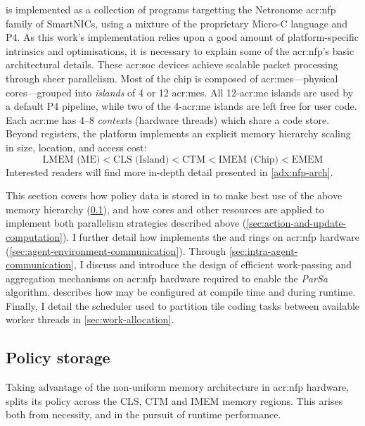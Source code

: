 \approachshort{} is implemented as a collection of programs targetting the Netronome \gls{acr:nfp} family of SmartNICs, using a mixture of the proprietary Micro-C language and P4.
As this work's implementation relies upon a good amount of platform-specific intrinsics and optimisations, it is necessary to explain some of the \gls{acr:nfp}'s basic architectural details.
These \gls{acr:soc} devices achieve scalable packet processing through sheer parallelism.
Most of the chip is composed of \glspl{acr:me}---physical cores---grouped into \emph{islands} of 4 or 12 \glspl{acr:me}.
All 12-\gls{acr:me} islands are used by a default P4 pipeline, while two of the 4-\gls{acr:me} islands are left free for user code.
Each \gls{acr:me} has \numrange{4}{8} \emph{contexts} (hardware threads) which share a code store.
Beyond registers, the platform implements an explicit memory hierarchy scaling in size, location, and access cost:
$$\text{LMEM (ME)} < \text{CLS (Island)} < \text{CTM} < \text{IMEM (Chip)} < \text{EMEM}$$
Interested readers will find more in-depth detail presented in \cref{adx:nfp-arch}.

This section covers how policy data is stored in \approachshort{} to make best use of the above memory hierarchy (\cref{sec:policy-storage}), and how cores and other resources are applied to implement both parallelism strategies described above (\cref{sec:action-and-update-computation}).
I further detail how \approachshort{} implements the \inring{} and \outring{} rings on \gls{acr:nfp} hardware (\cref{sec:agent-environment-communication}).
Through \cref{sec:intra-agent-communication}, I discuss and introduce the design of efficient work-passing and aggregation mechanisms on \gls{acr:nfp} hardware required to enable the \emph{ParSa} algorithm.
 describes how \approachshort{} may be configured at compile time and during runtime.
Finally, I detail the scheduler used to partition tile coding tasks between available worker threads in \cref{sec:work-allocation}.


\subsection{Policy storage}\label{sec:policy-storage}
Taking advantage of the non-uniform memory architecture in \gls{acr:nfp} hardware, \approachshort{} splits its policy across the CLS, CTM and IMEM memory regions.
This arises both from necessity, and in the pursuit of runtime performance.

